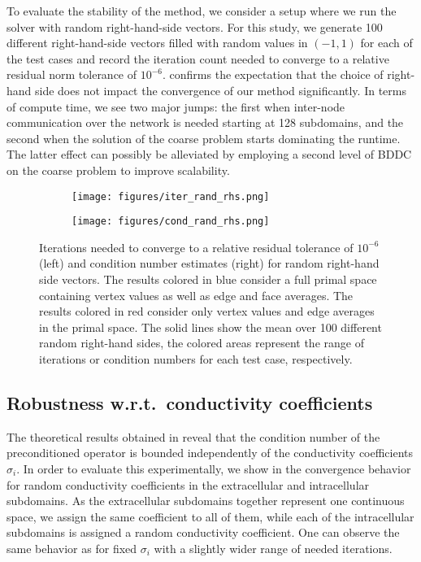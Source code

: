 To evaluate the stability of the method, we consider a setup where we run the solver with random right-hand-side vectors. For this study, we generate 100 different right-hand-side vectors filled with random values in $(-1,1)$ for each of the test cases and record the iteration count needed to converge to a relative residual norm tolerance of $10^{-6}$.  confirms the expectation that the choice of right-hand side does not impact the convergence of our method significantly. In terms of compute time, we see two major jumps: the first when inter-node communication over the network is needed starting at 128 subdomains, and the second when the solution of the coarse problem starts dominating the runtime. The latter effect can possibly be alleviated by employing a second level of BDDC on the coarse problem to improve scalability.

\begin{figure}
    \centering
    \begin{subfigure}[b]{0.4\textwidth}
        \texttt{[image: figures/iter\_rand\_rhs.png]}
    \end{subfigure}
    \begin{subfigure}[b]{0.4\textwidth}
        \texttt{[image: figures/cond\_rand\_rhs.png]}
    \end{subfigure}
    \caption{Iterations needed to converge to a relative residual tolerance of $10^{-6}$ (left) and condition number estimates (right) for random right-hand side vectors. The results colored in blue consider a full primal space containing vertex values as well as edge and face averages. The results colored in red consider only vertex values and edge averages in the primal space. The solid lines show the mean over 100 different random right-hand sides, the colored areas represent the range of iterations or condition numbers for each test case, respectively.}
    \label{fig:rand_rhs}
\end{figure}

\subsection{Robustness w.r.t.\ conductivity coefficients}
The theoretical results obtained in  reveal that the condition number of the preconditioned operator is bounded independently of the conductivity coefficients $\sigma_i$. In order to evaluate this experimentally, we show in  the convergence behavior for random conductivity coefficients in the extracellular and intracellular subdomains. As the extracellular subdomains together represent one continuous space, we assign the same coefficient to all of them, while each of the intracellular subdomains is assigned a random conductivity coefficient. One can observe the same behavior as for fixed $\sigma_i$ with a slightly wider range of needed iterations.

